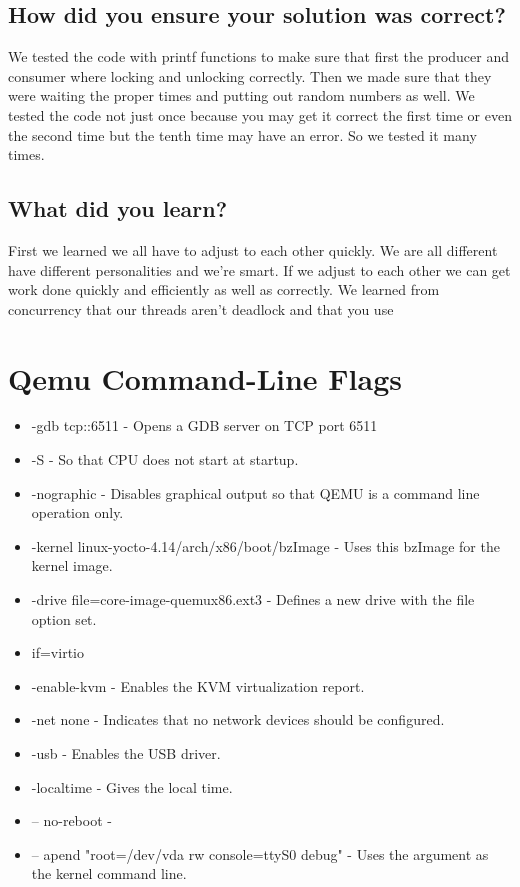 \documentclass[draftclsnofoot,onecolumn,10pt,compsoc]{IEEEtran}
\begin{document}
\subsection{How did you ensure your solution was correct?}
We tested the code with printf functions to make sure that first the producer and consumer where locking and unlocking correctly.  Then we made sure that they were waiting the proper times and putting out random numbers as well.  We tested the code not just once because you may get it correct the first time or even the second time but the tenth time may have an error.  So we tested it many times.  
\subsection{What did you learn?}
First we learned we all have to adjust to each other quickly.  We are all different have different personalities and we're smart. If we adjust to each other we can get work done quickly and efficiently as well as correctly. We learned from concurrency that our threads aren't deadlock and that you use  
\section{Qemu Command-Line Flags}
\begin{itemize}
	\item -gdb tcp::6511 - Opens a GDB server on TCP port 6511
	\item -S - So that CPU does not start at startup.
	\item -nographic - Disables graphical output so that QEMU is a command line operation only.
	\item -kernel linux-yocto-4.14/arch/x86/boot/bzImage - Uses this bzImage for the kernel image.
	\item -drive file=core-image-quemux86.ext3 - Defines a new drive with the file option set.
	\item if=virtio
	\item -enable-kvm - Enables the KVM virtualization report.
	\item -net none - Indicates that no network devices should be configured.
	\item -usb - Enables the USB driver.
	\item -localtime - Gives the local time.
	\item -- no-reboot -
	\item -- apend "root=/dev/vda rw console=ttyS0 debug" - Uses the argument as the kernel command line.
\end{itemize}
\end{document}
